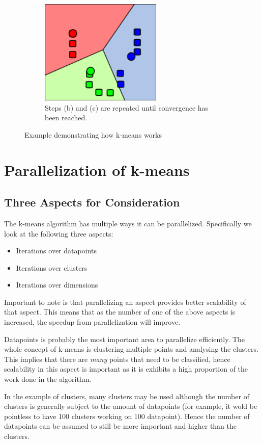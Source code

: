 \documentclass{article}
\begin{document}
\begin{figure}
    \begin{subfigure}{0.5\textwidth}
        \includegraphics[width=0.9\linewidth, height=5cm]{Pictures/K_Means_Example_Step_4.png}
        \caption{Steps (b) and (c) are repeated until convergence has been reached.}
    \end{subfigure}
\caption{Example demonstrating how k-means works}

\end{figure}



\section{Parallelization of k-means}
\subsection{Three Aspects for Consideration}
The k-means algorithm has multiple ways it can be parallelized. Specifically we look at the following three aspects:
\begin{itemize}
	\item Iterations over datapoints
	\item Iterations over clusters
	\item Iterations over dimensions
\end{itemize}


Important to note is that parallelizing an aspect provides better scalability of that aspect. This means that as the number of one of the above aspects is increased, the speedup from parallelization will improve.

Datapoints is probably the most important area to parallelize efficiently. The whole concept of k-means is clustering multiple points and analysing the clusters. This implies that there are \emph{many} points that need to be classified, hence scalability in this aspect is important as it is exhibits a high proportion of the work done in the algorithm.

In the example of clusters, many clusters may be used although the number of clusters is generally subject to the amount of datapoints (for example, it wold be pointless to have 100 clusters working on 100 datapoint). Hence the number of datapoints can be assumed to still be more important and higher than the clusters.
\end{document}
